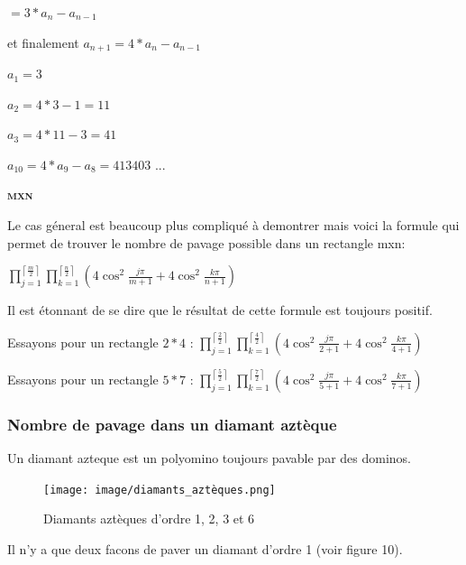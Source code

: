\documentclass{article}
\begin{document}
$= 3*a_{n} - a_{n-1}$

et finalement $a_{n+1} = 4*a_{n} - a_{n-1}$

$a_{1} = 3$

$a_{2} = 4*3 - 1 = 11$

$a_{3} = 4*11 - 3 = 41$

$a_{10} = 4*a_{9} - a_{8} = 413403$ ...


\hspace{1.5cm}

\textbf{\textsc{mxn}}

Le cas géneral est beaucoup plus compliqué à demontrer mais voici la formule qui permet de trouver le nombre de pavage possible dans un rectangle mxn:

\begin{center}
    $\prod_{j=1}^{\left \lceil \frac{m}{2} \right \rceil} \prod_{k=1}^{\left \lceil \frac{n}{2} \right \rceil}\left ( 4\cos^{2}\frac{j\pi }{m+1}+4\cos^{2}\frac{k\pi }{n+1} \right )$
\end{center}

Il est étonnant de se dire que le résultat de cette formule est toujours positif.

Essayons pour un rectangle $2*4$ : $\prod_{j=1}^{\left \lceil \frac{2}{2} \right \rceil} \prod_{k=1}^{\left \lceil \frac{4}{2} \right \rceil}\left ( 4\cos^{2}\frac{j\pi }{2+1}+4\cos^{2}\frac{k\pi }{4+1} \right )$

Essayons pour un rectangle $5*7$ : $\prod_{j=1}^{\left \lceil \frac{5}{2} \right \rceil} \prod_{k=1}^{\left \lceil \frac{7}{2} \right \rceil}\left ( 4\cos^{2}\frac{j\pi }{5+1}+4\cos^{2}\frac{k\pi }{7+1} \right )$



\hspace{2cm}

\subsubsection{Nombre de pavage dans un diamant aztèque}

Un diamant azteque est un polyomino toujours pavable par des dominos.

\begin{figure} [h]
    \center
    \texttt{[image: image/diamants\_aztèques.png]}
    \caption{Diamants aztèques d'ordre 1, 2, 3 et 6}
\end{figure}

Il n'y a que deux facons de paver un diamant d'ordre 1 (voir figure 10).
\end{document}
